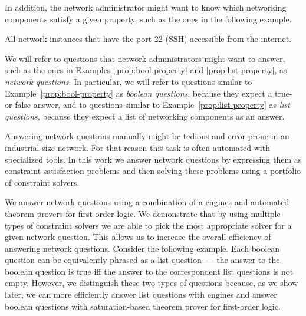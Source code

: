 In addition, the network administrator might want to know which networking components satisfy a given property, such as the ones in the following example.
\begin{example}\label{prop:list-property}
All network instances that have the port 22 (SSH) accessible from the internet.
\end{example}

We will refer to questions that network administrators might want to answer, such as the ones in Examples~\ref{prop:bool-property} and \ref{prop:list-property}, as \emph{network questions}. In particular, we will refer to questions similar to Example~\ref{prop:bool-property} as \emph{boolean questions}, because they expect a true-or-false answer, and to questions similar to Example~\ref{prop:list-property} as \emph{list questions}, because they expect a list of networking components as an answer.

%
%
Answering network questions manually might be tedious and error-prone in an industrial-size network. For that reason this task is often automated with specialized tools. In this work we answer network questions by expressing them as constraint satisfaction problems and then solving these problems using a portfolio of constraint solvers.

We answer network questions using a combination of a \Datalog engines and automated theorem provers for first-order logic. We demonstrate that by using multiple types of constraint solvers we are able to pick the most appropriate solver for a given network question. This allows us to increase the overall efficiency of answering network questions. Consider the following example. Each boolean question can be equivalently phrased as a list question~--- the answer to the boolean question is true iff the answer to the correspondent list questions is not empty. However, we distinguish these two types of questions because, as we show later, we can more efficiently answer list questions with \Datalog engines and answer boolean questions with saturation-based theorem prover for first-order logic.


